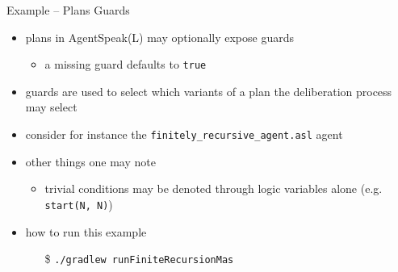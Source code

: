 \documentclass[presentation]{beamer}\mode<presentation>{\usetheme{AMSBolognaFC}}
\begin{document}
\begin{frame}[c, allowframebreaks]{Example \theJasonExample{} -- Plans Guards}
    \begin{itemize}
        \item plans in AgentSpeak(L) may optionally expose \alert{guards}
        \begin{itemize}
            \item a missing guard defaults to \texttt{true}
        \end{itemize}
        
        \vspace{.3cm}
        
        \item guards are used to \alert{select} which variants of a plan the deliberation process may select 
        
        \vspace{.3cm} 
        
        \item consider for instance the \texttt{finitely\_recursive\_agent.asl} agent
        
        
        \vspace{.3cm}
        
        \item other things one may note
        \begin{itemize}
            \item trivial conditions may be denoted through logic variables alone (e.g. \texttt{start(N, N)})
        \end{itemize}
        
        \vspace{.3cm}
        
        \item how to run this example
        \begin{itemize}
            \item[\$] \texttt{./gradlew run\alert{FiniteRecursion}Mas}
        \end{itemize}
        
    \end{itemize}
\end{frame}
\end{document}
